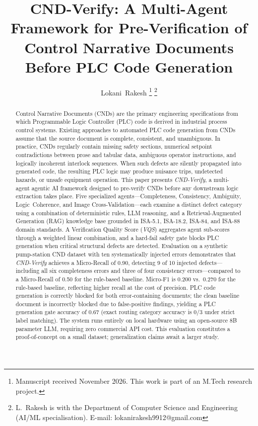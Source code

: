 \documentclass[journal]{IEEEtran}
\title{CND-Verify: A Multi-Agent Framework for Pre-Verification of Control
Narrative Documents Before PLC Code Generation}
\author{Lokani~Rakesh%
\thanks{Manuscript received November 2026. This work is part of an M.Tech
research project.}%
\thanks{L.~Rakesh is with the Department of Computer Science and Engineering
(AI/ML specialisation). E-mail: lokanirakesh9912@gmail.com}}
\newcommand{\sys}{\textit{CND-Verify}}
\newcommand{\vqs}{\textit{VQS}}
\begin{document}
\maketitle

\begin{abstract}
Control Narrative Documents (CNDs) are the primary engineering specifications
from which Programmable Logic Controller (PLC) code is derived in industrial
process control systems. Existing approaches to automated PLC code generation
from CNDs assume that the source document is complete, consistent, and
unambiguous. In practice, CNDs regularly contain missing safety sections,
numerical setpoint contradictions between prose and tabular data, ambiguous
operator instructions, and logically incoherent interlock sequences. When such
defects are silently propagated into generated code, the resulting PLC logic may
produce nuisance trips, undetected hazards, or unsafe equipment operation.
This paper presents \sys{}, a multi-agent agentic AI framework designed to
pre-verify CNDs before any downstream logic extraction takes place. Five
specialized agents---Completeness, Consistency, Ambiguity, Logic~Coherence, and
Image Cross-Validation---each examine a distinct defect category using a
combination of deterministic rules, LLM reasoning, and a Retrieval-Augmented
Generation (RAG) knowledge base grounded in ISA-5.1, ISA-18.2, ISA-84, and
ISA-88 domain standards. A Verification Quality Score (\vqs{}) aggregates agent
sub-scores through a weighted linear combination, and a hard-fail safety gate
blocks PLC generation when critical structural defects are detected. Evaluation
on a synthetic pump-station CND dataset with ten systematically injected errors
demonstrates that \sys{} achieves a Micro-Recall of 0.90, detecting 9 of 10
injected defects---including all six completeness errors and three of four
consistency errors---compared to a Micro-Recall of 0.50 for the rule-based
baseline. Micro-F1 is 0.200 vs.\ 0.270 for the rule-based baseline, reflecting
higher recall at the cost of precision. PLC code generation is correctly blocked
for both error-containing documents; the clean baseline document is incorrectly
blocked due to false-positive findings, yielding a PLC generation gate accuracy
of 0.67 (exact routing category accuracy is 0/3 under strict label matching).
The system runs entirely on local hardware using an open-source 8B parameter
LLM, requiring zero commercial API cost. This evaluation constitutes a
proof-of-concept on a small dataset; generalization claims await a larger study.
\end{abstract}
\end{document}
